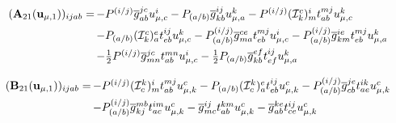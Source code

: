 \begin{subappendices}
\begin{equation}
    \begin{array}{r@{\,}l}
        (\mathbf{A}_{21}(\mathbf{u}_{\mu,1}))_{ijab}
        =
        &
        -
        P^{(i/j)}
        \overline{g}_{ab}^{jc}
        u_{\mu,c}^i
        -
        P_{(a/b)}
        \overline{g}_{kb}^{ij}
        u_{\mu,a}^k
        -
        P^{(i/j)}
        (\mathcal{I}_k^c)_m^i
        t_{ab}^{mj}
        u_{\mu,c}^k
        \\[5pt]
        &
        -
        P_{(a/b)}
        (\mathcal{I}_k^c)_a^e
        t_{eb}^{ij}
        u_{\mu,c}^k
        -
        P_{(a/b)}^{(i/j)}
        \overline{g}_{ma}^{ce}
        t_{eb}^{mj}
        u_{\mu,c}^i
        -
        P_{(a/b)}^{(i/j)}
        \overline{g}_{km}^{ie}
        t_{eb}^{mj}
        u_{\mu,a}^k
        \\[5pt]
        &
        -
        \tfrac{1}{2}
        P^{(i/j)}
        \overline{g}_{mn}^{jc}
        t_{ab}^{mn}
        u_{\mu,c}^i
        -
        \tfrac{1}{2}
        P_{(a/b)}
        \overline{g}_{kb}^{ef}
        t_{ef}^{ij}
        u_{\mu,a}^k
    \end{array}
\end{equation}

\begin{equation}
    \begin{array}{r@{\,}l}
        (\mathbf{B}_{21}(\mathbf{u}_{\mu,1}))_{ijab}
        =
        &
        -
        P^{(i/j)}
        (\mathcal{I}_c^k)_m^i
        t_{ab}^{mj}
        u_{\mu,k}^c
        -
        P_{(a/b)}
        (\mathcal{I}_c^k)_a^e
        t_{eb}^{ij}
        u_{\mu,k}^c
        -
        P_{(a/b)}^{(i/j)}
        \overline{g}_{cb}^{je}
        t_{ae}^{ik}
        u_{\mu,k}^c
        \\[5pt]
        &
        -
        P_{(a/b)}^{(i/j)}
        \overline{g}_{kj}^{mb}
        t_{ac}^{im}
        u_{\mu,k}^c
        -
        \overline{g}_{mc}^{ij}
        t_{ab}^{km}
        u_{\mu,k}^c
        -
        \overline{g}_{ab}^{ke}
        t_{ce}^{ij}
        u_{\mu,k}^c
    \end{array}
\end{equation}


\end{subappendices}
